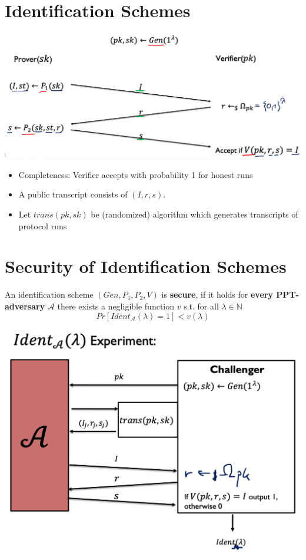 \section{Identification Schemes}
    \begin{center}
	    \includegraphics[width=160mm]{Graphics/Digital Signatures/is2.png}
    \end{center}
    \begin{itemize}
        \item Completeness: Verifier accepts with probability 1 for honest runs
        \item A public transcript consists of $(I,r,s)$.
        \item Let $trans(pk,sk)$ be (randomized) algorithm which generates transcripts of protocol runs
    \end{itemize}

\section{Security of Identification Schemes}
    \begin{definition}
        An identification scheme $(Gen,P_1,P_2,V)$ is \textbf{secure}, if it holds for \textbf{every PPT-adversary} $\mathcal{A}$ 
        there exists a negligible function $v$ s.t. for all $\lambda \in \mathbb{N}$
        $$Pr[Ident_{\mathcal{A}}(\lambda)=1] < v(\lambda)$$
    \end{definition}
    \begin{center}
	    \includegraphics[width=140mm]{Graphics/Digital Signatures/is3.png}
    \end{center}

